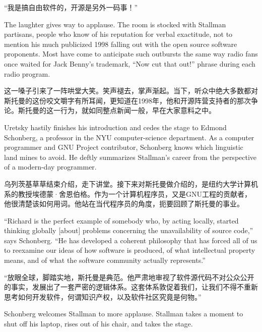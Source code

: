 \ifdefined\chs
``我是搞自由软件的，开源是另外一码事！''
\fi

\ifdefined\eng
The laughter gives way to applause. The room is stocked with Stallman partisans, people who know of his reputation for verbal exactitude, not to mention his much publicized 1998 falling out with the open source software proponents. Most have come to anticipate such outbursts the same way radio fans once waited for Jack Benny's trademark, ``Now cut that out!'' phrase during each radio program.
\fi

\ifdefined\chs
这一嗓子引来了一阵哄堂大笑。笑声褪去，掌声渐起。当下，听众中绝大多数都对斯托曼的这份咬文嚼字有所耳闻，更知道在1998年，他和开源阵营支持者的那次争论。斯托曼的这一行为，就如同整点新闻一般，早在大家意料之中。
\fi

\ifdefined\eng
Uretsky hastily finishes his introduction and cedes the stage to Edmond Schonberg, a professor in the NYU computer-science department. As a computer programmer and GNU Project contributor, Schonberg knows which linguistic land mines to avoid. He deftly summarizes Stallman's career from the perspective of a modern-day programmer.
\fi

\ifdefined\chs
乌列茨基草草结束介绍，走下讲堂。接下来对斯托曼做介绍的，是纽约大学计算机系的教授埃德蒙·舍恩伯格。作为一个计算机程序员，又是GNU工程的贡献者，他很清楚该如何用词。他站在当代程序员的角度，扼要回顾了斯托曼的事业。
\fi

\ifdefined\eng
``Richard is the perfect example of somebody who, by acting locally, started thinking globally [about] problems concerning the unavailability of source code,'' says Schonberg. ``He has developed a coherent philosophy that has forced all of us to reexamine our ideas of how software is produced, of what intellectual property means, and of what the software community actually represents.''
\fi

\ifdefined\chs
``放眼全球，脚踏实地，斯托曼是典范。他严肃地审视了软件源代码不对公众公开的事实，发展出了一套严密的逻辑体系。这套体系敦促着我们，让我们不得不重新思考如何开发软件，何谓知识产权，以及软件社区究竟是何物。''
\fi

\ifdefined\eng
Schonberg welcomes Stallman to more applause. Stallman takes a moment to shut off his laptop, rises out of his chair, and takes the stage.
\fi


